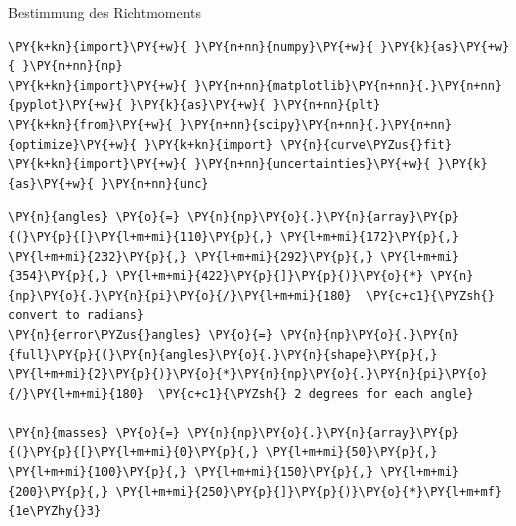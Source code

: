 
    
    Bestimmung des Richtmoments

    \begin{tcolorbox}[breakable, size=fbox, boxrule=1pt, pad at break*=1mm,colback=cellbackground, colframe=cellborder]
\begin{Verbatim}[commandchars=\\\{\}]
\PY{k+kn}{import}\PY{+w}{ }\PY{n+nn}{numpy}\PY{+w}{ }\PY{k}{as}\PY{+w}{ }\PY{n+nn}{np}
\PY{k+kn}{import}\PY{+w}{ }\PY{n+nn}{matplotlib}\PY{n+nn}{.}\PY{n+nn}{pyplot}\PY{+w}{ }\PY{k}{as}\PY{+w}{ }\PY{n+nn}{plt}
\PY{k+kn}{from}\PY{+w}{ }\PY{n+nn}{scipy}\PY{n+nn}{.}\PY{n+nn}{optimize}\PY{+w}{ }\PY{k+kn}{import} \PY{n}{curve\PYZus{}fit}
\PY{k+kn}{import}\PY{+w}{ }\PY{n+nn}{uncertainties}\PY{+w}{ }\PY{k}{as}\PY{+w}{ }\PY{n+nn}{unc}
\end{Verbatim}
\end{tcolorbox}

    \begin{tcolorbox}[breakable, size=fbox, boxrule=1pt, pad at break*=1mm,colback=cellbackground, colframe=cellborder]
\begin{Verbatim}[commandchars=\\\{\}]
\PY{n}{angles} \PY{o}{=} \PY{n}{np}\PY{o}{.}\PY{n}{array}\PY{p}{(}\PY{p}{[}\PY{l+m+mi}{110}\PY{p}{,} \PY{l+m+mi}{172}\PY{p}{,} \PY{l+m+mi}{232}\PY{p}{,} \PY{l+m+mi}{292}\PY{p}{,} \PY{l+m+mi}{354}\PY{p}{,} \PY{l+m+mi}{422}\PY{p}{]}\PY{p}{)}\PY{o}{*} \PY{n}{np}\PY{o}{.}\PY{n}{pi}\PY{o}{/}\PY{l+m+mi}{180}  \PY{c+c1}{\PYZsh{} convert to radians}
\PY{n}{error\PYZus{}angles} \PY{o}{=} \PY{n}{np}\PY{o}{.}\PY{n}{full}\PY{p}{(}\PY{n}{angles}\PY{o}{.}\PY{n}{shape}\PY{p}{,} \PY{l+m+mi}{2}\PY{p}{)}\PY{o}{*}\PY{n}{np}\PY{o}{.}\PY{n}{pi}\PY{o}{/}\PY{l+m+mi}{180}  \PY{c+c1}{\PYZsh{} 2 degrees for each angle}

\PY{n}{masses} \PY{o}{=} \PY{n}{np}\PY{o}{.}\PY{n}{array}\PY{p}{(}\PY{p}{[}\PY{l+m+mi}{0}\PY{p}{,} \PY{l+m+mi}{50}\PY{p}{,} \PY{l+m+mi}{100}\PY{p}{,} \PY{l+m+mi}{150}\PY{p}{,} \PY{l+m+mi}{200}\PY{p}{,} \PY{l+m+mi}{250}\PY{p}{]}\PY{p}{)}\PY{o}{*}\PY{l+m+mf}{1e\PYZhy{}3}
\end{Verbatim}
\end{tcolorbox}


